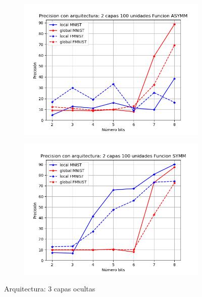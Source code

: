 \begin{figure}[H]
\begin{subfigure}[H]{0.475\textwidth}
    \includegraphics[width=\textwidth]{imagenes/fa/Precision con arquitectura: 2 capas 100 unidades Funcion ASYMM.png}
    \end{subfigure}
    \begin{subfigure}[H]{0.475\textwidth}
    \includegraphics[width=\textwidth]{imagenes/fa/Precision con arquitectura: 2 capas 100 unidades Funcion SYMM.png}
    \end{subfigure}
    \caption{Arquitectura: 3 capas ocultas}
\end{figure}

